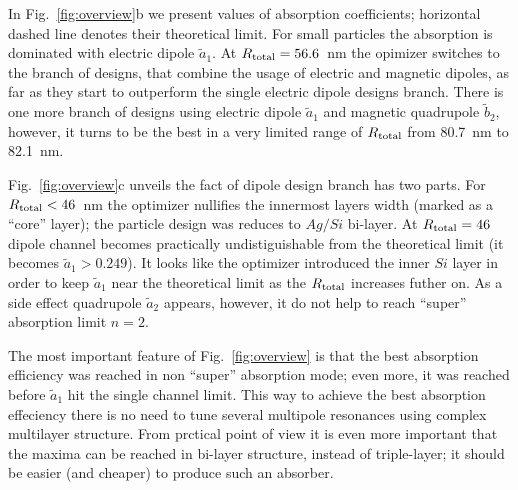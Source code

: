 \documentclass[aps,prl,twocolumn,showpacs,superscriptaddress,groupedaddress]{revtex4-1}
\begin{document}
In Fig.~\ref{fig:overview}b we present values of absorption
coefficients; horizontal dashed line denotes their theoretical limit.
For small particles the absorption is dominated with electric dipole
$\tilde{a}_1$.  At $R_{\rm total} = 56.6$~nm the opimizer switches to
the branch of designs, that combine the usage of electric and magnetic
dipoles, as far as they start to outperform the single electric dipole
designs branch.  There is one more branch of designs using electric
dipole $\tilde{a}_1$ and magnetic quadrupole $\tilde{b}_2$, however,
it turns to be the best in a very limited range of $R_{\rm total}$ from
80.7~nm to 82.1~nm.

Fig.~\ref{fig:overview}c unveils the fact of dipole design branch has
two parts. For $R_{\rm total}<46$~nm the optimizer nullifies the
innermost layers width (marked as a ``core'' layer); the particle
design was reduces to $Ag/Si$ bi-layer.  At $R_{\rm total}=46$ dipole
channel becomes practically undistiguishable from the theoretical
limit (it becomes $\tilde{a}_1>0.249$).  It looks like the optimizer
introduced the inner $Si$ layer in order to keep $\tilde{a}_1$ near
the theoretical limit as the $R_{\rm total}$ increases futher on.  As
a side effect quadrupole $\tilde{a}_2$ appears, however, it do not
help to reach ``super'' absorption limit $n=2$.

The most important feature of Fig.~\ref{fig:overview} is that the best
absorption efficiency was reached in non ``super'' absorption mode;
even more, it was reached before $\tilde{a}_1$ hit the single channel
limit.  This way to achieve the best absorption effeciency there is no
need to tune several multipole resonances using complex multilayer
structure.  From prctical point of view it is even more important that
the maxima can be reached in bi-layer structure, instead of
triple-layer; it should be easier (and cheaper) to produce such an
absorber.
\end{document}
